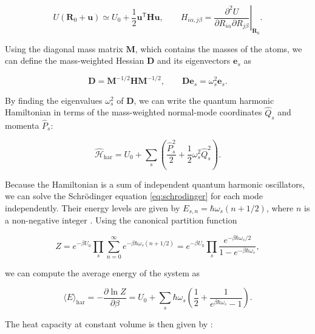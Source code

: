 \documentclass[12pt,a4paper]{article}
\numberwithin{equation}{section}
\begin{document}
\begin{equation}
  U(\bm R_0+\bm u)\simeq U_0+\frac12\bm u^{\mathsf T}\bm H\bm u,
  \qquad H_{i\alpha,j\beta}=\left.\frac{\partial^2 U}{\partial R_{i\alpha}\partial R_{j\beta}}\right|_{\bm R_0}.
  \label{eq:harmonic-hessian}
\end{equation}

Using the diagonal mass matrix $\bm M$, which contains the masses of the atoms,
we can define the mass-weighted Hessian $\bm D$ and its eigenvectors $\bm e_s$ as

\begin{equation}
  \bm D=\bm M^{-1/2}\bm H\bm M^{-1/2},
  \qquad \bm D\bm e_s=\omega_s^2\bm e_s.
  \label{eq:normal-mode-frequencies}
\end{equation}

By finding the eigenvalues $\omega_s^2$ of $\bm D$, we can write the quantum harmonic Hamiltonian
in terms of the mass-weighted normal-mode coordinates $\hat Q_s$ and momenta $\hat P_s$:

\begin{equation}
  \hat{\mathcal H}_{\mathrm{har}}=U_0+\sum_s\left(\frac{\hat P_s^2}{2}+\frac12\omega_s^2\hat Q_s^2\right).
  \label{eq:normal-mode-hamiltonian}
\end{equation}

Because the Hamiltonian is a sum of independent quantum harmonic oscillators,
we can solve the Schrödinger equation \eqref{eq:schrodinger} for each mode independently.
Their energy levels are given by $E_{s,n}=\hbar\omega_s(n+1/2)$, where $n$ is a non-negative integer \cite{cohen-tannoudji2020}.
Using the canonical partition function

\begin{equation}
  Z=e^{-\beta U_0}\prod_s\sum_{n=0}^{\infty}e^{-\beta\hbar\omega_s(n+1/2)}
    =e^{-\beta U_0}\prod_s\frac{e^{-\beta\hbar\omega_s/2}}{1-e^{-\beta\hbar\omega_s}},
  \label{eq:harmonic-partition-function}
\end{equation}

we can compute the average energy of the system as

\begin{equation}
  \langle E\rangle_{\mathrm{har}}=-\frac{\partial\ln Z}{\partial\beta}
    =U_0+\sum_s\hbar\omega_s\left(\frac12+\frac{1}{e^{\beta\hbar\omega_s}-1}\right).
  \label{eq:harmonic-average-energy}
\end{equation}

The heat capacity at constant volume is then given by \cite{ashcroft1976,kittel2005}:
\end{document}
